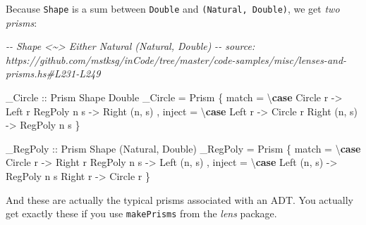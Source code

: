 \documentclass[]{article}
\newenvironment{Shaded}{}{}
\newcommand{\CommentTok}[1]{\textcolor[rgb]{0.38,0.63,0.69}{\textit{#1}}}
\newcommand{\DataTypeTok}[1]{\textcolor[rgb]{0.56,0.13,0.00}{#1}}
\newcommand{\KeywordTok}[1]{\textcolor[rgb]{0.00,0.44,0.13}{\textbf{#1}}}
\newcommand{\NormalTok}[1]{#1}
\newcommand{\OtherTok}[1]{\textcolor[rgb]{0.00,0.44,0.13}{#1}}
\begin{document}
Because \texttt{Shape} is a sum between \texttt{Double} and
\texttt{(Natural,\ Double)}, we get \emph{two prisms}:

\begin{Shaded}
\begin{Highlighting}[]
\CommentTok{{-}{-} Shape \textless{}\textasciitilde{}\textgreater{} Either Natural (Natural, Double)}
\CommentTok{{-}{-} source: https://github.com/mstksg/inCode/tree/master/code{-}samples/misc/lenses{-}and{-}prisms.hs\#L231{-}L249}

\OtherTok{\_Circle ::} \DataTypeTok{Prism\textquotesingle{}} \DataTypeTok{Shape} \DataTypeTok{Double}
\NormalTok{\_Circle }\OtherTok{=} \DataTypeTok{Prism\textquotesingle{}}
\NormalTok{    \{ match  }\OtherTok{=}\NormalTok{ \textbackslash{}}\KeywordTok{case}
        \DataTypeTok{Circle}\NormalTok{  r    }\OtherTok{{-}\textgreater{}} \DataTypeTok{Left}\NormalTok{ r}
        \DataTypeTok{RegPoly}\NormalTok{ n s  }\OtherTok{{-}\textgreater{}} \DataTypeTok{Right}\NormalTok{ (n, s)}
\NormalTok{    , inject }\OtherTok{=}\NormalTok{ \textbackslash{}}\KeywordTok{case}
        \DataTypeTok{Left}\NormalTok{   r     }\OtherTok{{-}\textgreater{}} \DataTypeTok{Circle}\NormalTok{ r}
        \DataTypeTok{Right}\NormalTok{ (n, s) }\OtherTok{{-}\textgreater{}} \DataTypeTok{RegPoly}\NormalTok{ n s}
\NormalTok{    \}}

\OtherTok{\_RegPoly ::} \DataTypeTok{Prism\textquotesingle{}} \DataTypeTok{Shape}\NormalTok{ (}\DataTypeTok{Natural}\NormalTok{, }\DataTypeTok{Double}\NormalTok{)}
\NormalTok{\_RegPoly }\OtherTok{=} \DataTypeTok{Prism\textquotesingle{}}
\NormalTok{    \{ match  }\OtherTok{=}\NormalTok{ \textbackslash{}}\KeywordTok{case}
        \DataTypeTok{Circle}\NormalTok{  r    }\OtherTok{{-}\textgreater{}} \DataTypeTok{Right}\NormalTok{ r}
        \DataTypeTok{RegPoly}\NormalTok{ n s  }\OtherTok{{-}\textgreater{}} \DataTypeTok{Left}\NormalTok{ (n, s)}
\NormalTok{    , inject }\OtherTok{=}\NormalTok{ \textbackslash{}}\KeywordTok{case}
        \DataTypeTok{Left}\NormalTok{  (n, s) }\OtherTok{{-}\textgreater{}} \DataTypeTok{RegPoly}\NormalTok{ n s}
        \DataTypeTok{Right}\NormalTok{  r     }\OtherTok{{-}\textgreater{}} \DataTypeTok{Circle}\NormalTok{ r}
\NormalTok{    \}}
\end{Highlighting}
\end{Shaded}

And these are actually the typical prisms associated with an ADT. You actually
get exactly these if you use \texttt{makePrisms} from the \emph{lens} package.
\end{document}

